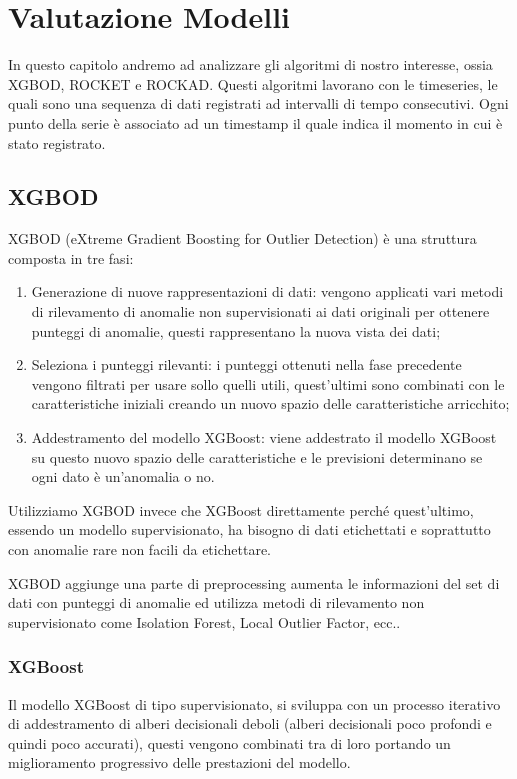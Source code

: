 \chapter{Valutazione Modelli}
In questo capitolo andremo ad analizzare gli algoritmi di nostro interesse, ossia XGBOD, ROCKET e ROCKAD.
Questi algoritmi lavorano con le timeseries, le quali sono una sequenza di dati registrati ad intervalli di tempo consecutivi. Ogni punto della serie è associato ad un timestamp il quale indica il momento in cui è stato registrato.

\section{XGBOD}
XGBOD (eXtreme Gradient Boosting for Outlier Detection) è una struttura composta in tre fasi:
\begin{enumerate}
    \item Generazione di nuove rappresentazioni di dati: vengono applicati vari metodi di rilevamento di anomalie non supervisionati ai dati originali per ottenere punteggi di anomalie, questi rappresentano la nuova vista dei dati;
    \item Seleziona i punteggi rilevanti: i punteggi ottenuti nella fase precedente vengono filtrati per usare sollo quelli utili, quest'ultimi sono combinati con le caratteristiche iniziali creando un nuovo spazio delle caratteristiche arricchito;
    \item Addestramento del modello XGBoost: viene addestrato il modello XGBoost su questo nuovo spazio delle caratteristiche e le previsioni determinano se ogni dato è un'anomalia o no.
\end{enumerate}
Utilizziamo XGBOD invece che XGBoost direttamente perché quest'ultimo, essendo un modello supervisionato, ha bisogno di dati etichettati e soprattutto con anomalie rare non facili da etichettare.

XGBOD aggiunge una parte di preprocessing aumenta le informazioni del set di dati con punteggi di anomalie ed utilizza metodi di rilevamento non supervisionato come Isolation Forest, Local Outlier Factor, ecc..

\subsection{XGBoost}
Il modello XGBoost di tipo supervisionato, si sviluppa con un processo iterativo di addestramento di alberi decisionali deboli (alberi decisionali poco profondi e quindi poco accurati), questi vengono combinati tra di loro portando un miglioramento progressivo delle prestazioni del modello.


